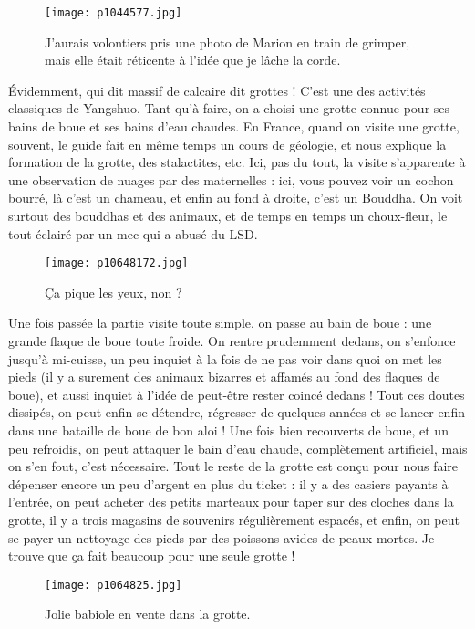 \documentclass{book}
\begin{document}
\begin{figure}[h]
\centering
\texttt{[image: p1044577.jpg]}
\caption*{J'aurais volontiers pris une photo de Marion en train de grimper, mais elle était réticente à l'idée que je lâche la corde.}
\end{figure}

Évidemment, qui dit massif de calcaire dit grottes ! C'est une des activités classiques de Yangshuo. Tant qu'à faire, on a choisi une grotte connue pour ses bains de boue et ses bains d'eau chaudes. En France, quand on visite une grotte, souvent, le guide fait en même temps un cours de géologie, et nous explique la formation de la grotte, des stalactites, etc. Ici, pas du tout, la visite s'apparente à une observation de nuages par des maternelles : ici, vous pouvez voir un cochon bourré, là c'est un chameau, et enfin au fond à droite, c'est un Bouddha. On voit surtout des bouddhas et des animaux, et de temps en temps un choux-fleur, le tout éclairé par un mec qui a abusé du LSD.


\begin{figure}[h]
\centering
\texttt{[image: p10648172.jpg]}
\caption*{Ça pique les yeux, non ?}
\end{figure}

Une fois passée la partie visite toute simple, on passe au bain de boue : une grande flaque de boue toute froide. On rentre prudemment dedans, on s'enfonce jusqu'à mi-cuisse, un peu inquiet à la fois de ne pas voir dans quoi on met les pieds (il y a surement des animaux bizarres et affamés au fond des flaques de boue), et aussi inquiet à l'idée de peut-être rester coincé dedans ! Tout ces doutes dissipés, on peut enfin se détendre, régresser de quelques années et se lancer enfin dans une bataille de boue de bon aloi ! Une fois bien recouverts de boue, et un peu refroidis, on peut attaquer le bain d'eau chaude, complètement artificiel, mais on s'en fout, c'est nécessaire. Tout le reste de la grotte est conçu pour nous faire dépenser encore un peu d'argent en plus du ticket : il y a des casiers payants à l'entrée, on peut acheter des petits marteaux pour taper sur des cloches dans la grotte, il y a trois magasins de souvenirs régulièrement espacés, et enfin, on peut se payer un nettoyage des pieds par des poissons avides de peaux mortes. Je trouve que ça fait beaucoup pour une seule grotte !


\begin{figure}[h]
\centering
\texttt{[image: p1064825.jpg]}
\caption*{Jolie babiole en vente dans la grotte.}
\end{figure}
\end{document}
